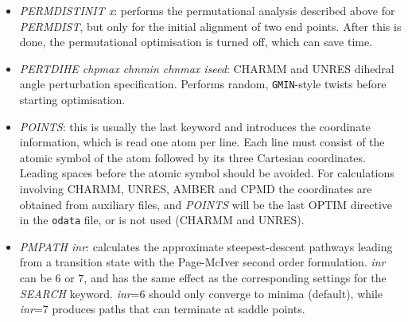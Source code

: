 \documentclass[12pt,a4paper,dvips]{article}
\begin{document}
\begin{itemize}
{\textrm 4}

{\textrm 3 2}

{\textrm 1 4 7 2 5 8 3 6 9}

{\textrm 2 0} 

{\textrm 2 3}

{\textrm 2 0} 

{\textrm 5 6}

{\textrm 2 0} 

{\textrm 8 9}

The first group of three oxygens has two atoms that must move with each oxygen,
i.e.~atoms 2 and 3 for oxygen 1, etc. Hydrogen permutations for each oxygen are
allowed by the three following groups. This scheme allows atoms to appear in more 
than one group. There must be a group containing each complete set of permutations
in order for permutation-inversion isomers to be recognised. The format
is compatible with an older scheme, where only pair swaps were allowed for
associated atoms, but now allows for more general permutations.

Scripts to generate allowed permutations automatically for CHARMM and AMBER are available from
the group web site. It is essential to use symmetrised versions of the corresponding
force fields! 

\item {\it PERMDISTINIT x\/}: performs the permutational analysis described above for {\it PERMDIST},
but only for the initial alignment of two end points. After this is done, the permutational
optimisation is turned off, which can save time.

\item {\it PERTDIHE chpmax chnmin chnmax iseed\/}: CHARMM 
and UNRES dihedral angle perturbation specification.
Performs random, {\tt GMIN}-style twists before starting optimisation.

\item {\it POINTS\/}: this is usually the last keyword and introduces the
coordinate information, which is read one atom per line. Each line must consist
of the atomic symbol of the atom followed by its three Cartesian coordinates.
Leading spaces before the atomic symbol should be avoided. For calculations
involving CHARMM, UNRES, AMBER and CPMD the coordinates are obtained from auxiliary files, 
and {\it POINTS\/} will be the last OPTIM directive in the {\tt odata} file, or
is not used (CHARMM and UNRES).

\item {\it PMPATH inr\/}: calculates the approximate steepest-descent pathways
leading from a transition state with the Page-McIver second order formulation.
{\it inr} can be 6 or 7, and has the same effect as the corresponding settings
for the {\it SEARCH\/} keyword. 
{\it inr\/}=6 should only converge to minima (default), while {\it inr\/}=7 
produces paths that can terminate at saddle points.


\end{itemize}
\end{document}
